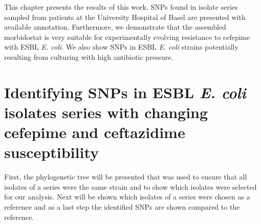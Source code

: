This chapter presents the results of this work. SNPs found in isolate series sampled from patients at the University Hospital of Basel are presented with available annotation. Furthermore, we demonstrate that the assembled morbidostat is very suitable for experimentally evolving resistance to cefepime with ESBL \textit{E. coli}. We also show SNPs in ESBL \textit{E. coli} strains potentially resulting from culturing with high antibiotic pressure.
\section{Identifying SNPs in ESBL \textit{E. coli} isolates series with changing cefepime and ceftazidime susceptibility}
First, the phylogenetic tree will be presented that was used to ensure that all isolates of a series were the same strain and to show which isolates were selected for our analysis. Next will be shown which isolates of a series were chosen as a reference and as a last step the identified SNPs are shown compared to the reference. 
